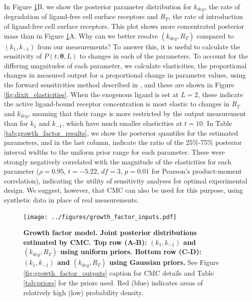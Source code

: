In Figure \ref{fig:growth_factor_inputs}B, we show the posterior parameter distribution for $k_{deg}$, the rate of degradation of ligand-free cell surface receptors and $R_T$, the rate of introduction of ligand-free cell surface receptors. This plot shows more concentrated posterior mass than in Figure \ref{fig:growth_factor_inputs}A. Why can we better resolve $(k_{deg},R_T)$ compared to $(k_1,k_{-1})$ from our measurements? To answer this, it is useful to calculate the sensitivity of $P(t; \boldsymbol{\theta}, L)$ to changes in each of the parameters. To account for the differing magnitudes of each parameter, we calculate elasticities, the proportional changes in measured output for a proportional change in parameter values, using the forward sensitivities method described in \cite{DGCT2018}, and these are shown in Figure \ref{fig:dixit_elasticities}. When the exogenous ligand is set at $L=2$, these indicate the active ligand-bound receptor concentration is most elastic to changes in $R_T$ and $k_{deg}$, meaning that their range is more restricted by the output measurement than for $k_1$ and $k_{-1}$, which have much smaller elasticities at $t=10$. In Table \ref{tab:growth_factor_results}, we show the posterior quantiles for the estimated parameters, and in the last column, indicate the ratio of the 25\%-75\% posterior interval widths to the uniform prior range for each parameter. These were strongly negatively correlated with the magnitude of the elasticities for each parameter ($\rho=0.95$, $t=-5.22$, $df=3$, $p=0.01$ for Pearson's product-moment correlation), indicating the utility of sensitivity analyses for optimal experimental design. We suggest, however, that CMC can also be used for this purpose, using synthetic data in place of real measurements.


\begin{figure}[H]
	\centerline{\texttt{[image: ../figures/growth\_factor\_inputs.pdf]}}
	\caption{\textbf{Growth factor model. Joint posterior distributions estimated by CMC. Top row (A-B): $(k_1,k_{-1})$ and $(k_{deg},R_T)$ using uniform priors. Bottom row (C-D): $(k_1,k_{-1})$ and $(k_{deg},R_T)$ using Gaussian priors.} See Figure \ref{fig:growth_factor_outputs} caption for CMC details and Table \ref{tab:priors} for the priors used. Red (blue) indicates areas of relatively high (low) probability density.}
	\label{fig:growth_factor_inputs}
\end{figure}


